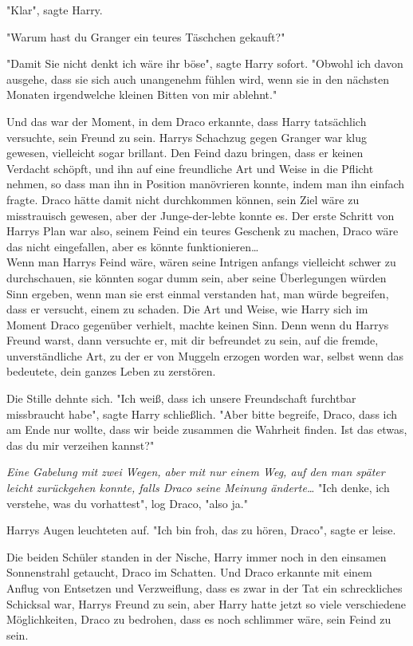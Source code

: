 {"Klar", sagte Harry.

"Warum hast du Granger ein teures Täschchen gekauft?"

"Damit Sie nicht denkt ich wäre ihr böse", sagte Harry sofort. "Obwohl ich davon ausgehe, dass sie sich auch unangenehm fühlen wird, wenn sie in den nächsten Monaten irgendwelche kleinen Bitten von mir ablehnt."

Und das war der Moment, in dem Draco erkannte, dass Harry tatsächlich versuchte, sein Freund zu sein. Harrys Schachzug gegen Granger war klug gewesen, vielleicht sogar brillant. Den Feind dazu bringen, dass er keinen Verdacht schöpft, und ihn auf eine freundliche Art und Weise in die Pflicht nehmen, so dass man ihn in Position manövrieren konnte, indem man ihn einfach fragte. Draco hätte damit nicht durchkommen können, sein Ziel wäre zu misstrauisch gewesen, aber der Junge-der-lebte konnte es. Der erste Schritt von Harrys Plan war also, seinem Feind ein teures Geschenk zu machen, Draco wäre das nicht eingefallen, aber es könnte funktionieren…\\ Wenn man Harrys Feind wäre, wären seine Intrigen anfangs vielleicht schwer zu durchschauen, sie könnten sogar dumm sein, aber seine Überlegungen würden Sinn ergeben, wenn man sie erst einmal verstanden hat, man würde begreifen, dass er versucht, einem zu schaden. Die Art und Weise, wie Harry sich im Moment Draco gegenüber verhielt, machte keinen Sinn. Denn wenn du Harrys Freund warst, dann versuchte er, mit dir befreundet zu sein, auf die fremde, unverständliche Art, zu der er von Muggeln erzogen worden war, selbst wenn das bedeutete, dein ganzes Leben zu zerstören.

Die Stille dehnte sich. "Ich weiß, dass ich unsere Freundschaft furchtbar missbraucht habe", sagte Harry schließlich. "Aber bitte begreife, Draco, dass ich am Ende nur wollte, dass wir beide zusammen die Wahrheit finden. Ist das etwas, das du mir verzeihen kannst?"

\emph{Eine Gabelung mit zwei Wegen, aber mit nur einem Weg, auf den man später leicht zurückgehen konnte, falls Draco seine Meinung änderte…} "Ich denke, ich verstehe, was du vorhattest", log Draco, "also ja."

Harrys Augen leuchteten auf. "Ich bin froh, das zu hören, Draco", sagte er leise.

Die beiden Schüler standen in der Nische, Harry immer noch in den einsamen Sonnenstrahl getaucht, Draco im Schatten. Und Draco erkannte mit einem Anflug von Entsetzen und Verzweiflung, dass es zwar in der Tat ein schreckliches Schicksal war, Harrys Freund zu sein, aber Harry hatte jetzt so viele verschiedene Möglichkeiten, Draco zu bedrohen, dass es noch schlimmer wäre, sein Feind zu sein.

}
